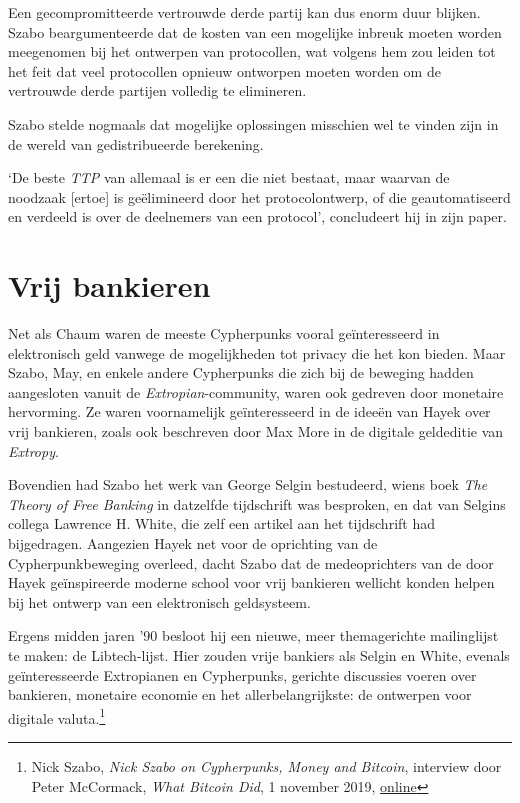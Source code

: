 \documentclass[
  a5paper,
  smalldemyvopaper,11pt,twoside,onecolumn,openright,extrafontsizes,
hidelinks]{memoir}
\begin{document}
Een gecompromitteerde vertrouwde derde partij kan dus enorm duur
blijken. Szabo beargumenteerde dat de kosten van een mogelijke inbreuk
moeten worden meegenomen bij het ontwerpen van protocollen, wat volgens
hem zou leiden tot het feit dat veel protocollen opnieuw ontworpen
moeten worden om de vertrouwde derde partijen volledig te elimineren.

Szabo stelde nogmaals dat mogelijke oplossingen misschien wel te vinden
zijn in de wereld van gedistribueerde berekening.

`De beste \emph{TTP} van allemaal is er een die niet bestaat, maar
waarvan de noodzaak {[}ertoe{]} is geëlimineerd door het
protocolontwerp, of die geautomatiseerd en verdeeld is over de
deelnemers van een protocol', concludeert hij in zijn paper.

\section{Vrij bankieren}\label{vrij-bankieren}

Net als Chaum waren de meeste Cypherpunks vooral geïnteresseerd in
elektronisch geld vanwege de mogelijkheden tot privacy die het kon
bieden. Maar Szabo, May, en enkele andere Cypherpunks die zich bij de
beweging hadden aangesloten vanuit de \emph{Extropian}-community, waren
ook gedreven door monetaire hervorming. Ze waren voornamelijk
geïnteresseerd in de ideeën van Hayek over vrij bankieren, zoals ook
beschreven door Max More in de digitale geldeditie van \emph{Extropy}.

Bovendien had Szabo het werk van George Selgin bestudeerd, wiens boek
\emph{The Theory of Free Banking} in datzelfde tijdschrift was
besproken, en dat van Selgins collega Lawrence H. White, die zelf een
artikel aan het tijdschrift had bijgedragen. Aangezien Hayek net voor de
oprichting van de Cypherpunkbeweging overleed, dacht Szabo dat de
medeoprichters van de door Hayek geïnspireerde moderne school voor vrij
bankieren wellicht konden helpen bij het ontwerp van een elektronisch
geldsysteem.

Ergens midden jaren '90 besloot hij een nieuwe, meer themagerichte
mailinglijst te maken: de Libtech-lijst. Hier zouden vrije bankiers als
Selgin en White, evenals geïnteresseerde Extropianen en Cypherpunks,
gerichte discussies voeren over bankieren, monetaire economie en het
allerbelangrijkste: de ontwerpen voor digitale valuta.\footnote{Nick
  Szabo, \emph{Nick Szabo on Cypherpunks, Money and Bitcoin}, interview
  door Peter McCormack, \emph{What Bitcoin Did}, 1 november 2019,
  \href{https://www.whatbitcoindid.com/podcast/nick-szabo-on-cypherpunks-money-and-bitcoin}{online}}
\end{document}
